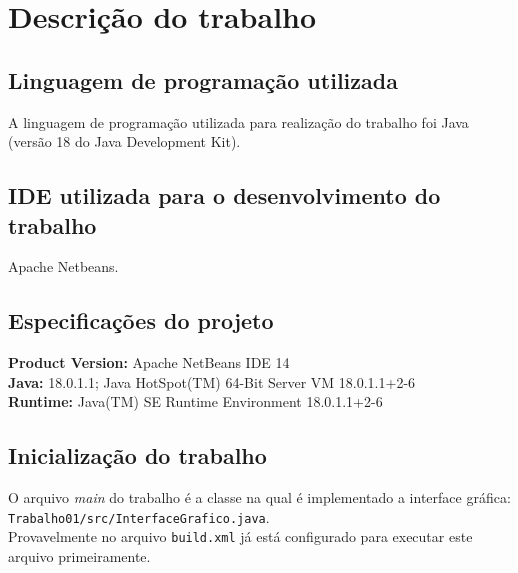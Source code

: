 \section{Descrição do trabalho}
\subsection{Linguagem de programação utilizada}
A linguagem de programação utilizada para realização do trabalho foi Java (versão 18 do Java Development Kit).

\subsection{IDE utilizada para o desenvolvimento do trabalho}
Apache Netbeans.

\subsection{Especificações do projeto}
\textbf{Product Version:} Apache NetBeans IDE 14\\
\textbf{Java:} 18.0.1.1; Java HotSpot(TM) 64-Bit Server VM 18.0.1.1+2-6\\
\textbf{Runtime:} Java(TM) SE Runtime Environment 18.0.1.1+2-6\\

\subsection{Inicialização do trabalho}
O arquivo \textit{main} do trabalho é a classe na qual é implementado a interface gráfica:\\\texttt{Trabalho01/src/InterfaceGrafico.java}.\\
Provavelmente no arquivo \texttt{build.xml} já está configurado para executar este arquivo primeiramente.
\newpage